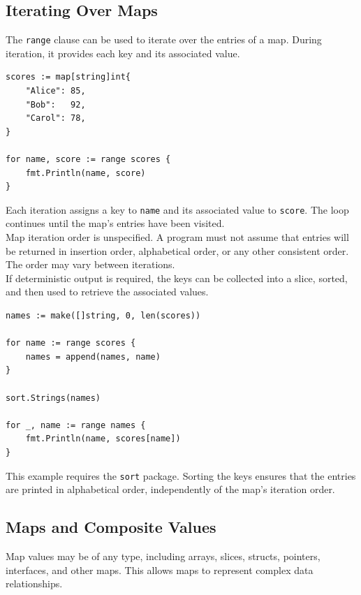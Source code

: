 \subsection{Iterating Over Maps}

The \texttt{range} clause can be used to iterate over the
entries of a map. During iteration, it provides each key
and its associated value.

\begin{lstlisting}
scores := map[string]int{
    "Alice": 85,
    "Bob":   92,
    "Carol": 78,
}

for name, score := range scores {
    fmt.Println(name, score)
}
\end{lstlisting}

Each iteration assigns a key to \texttt{name} and its
associated value to \texttt{score}. The loop continues
until the map's entries have been visited.\\

Map iteration order is unspecified. A program must not
assume that entries will be returned in insertion order,
alphabetical order, or any other consistent order.
The order may vary between iterations.\\

If deterministic output is required, the keys can be
collected into a slice, sorted, and then used to retrieve
the associated values.

\begin{lstlisting}
names := make([]string, 0, len(scores))

for name := range scores {
    names = append(names, name)
}

sort.Strings(names)

for _, name := range names {
    fmt.Println(name, scores[name])
}
\end{lstlisting}

This example requires the \texttt{sort} package. Sorting
the keys ensures that the entries are printed in
alphabetical order, independently of the map's iteration
order.

\subsection{Maps and Composite Values}

Map values may be of any type, including arrays, slices,
structs, pointers, interfaces, and other maps. This allows
maps to represent complex data relationships.\\

